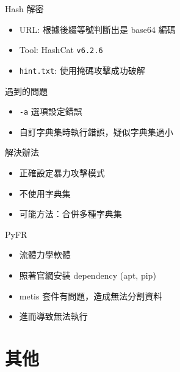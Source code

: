 \documentclass[aspectratio=169]{beamer}
\begin{document}
    \begin{frame}{Hash 解密}
        \begin{itemize}
            \item URL: 根據後綴等號判斷出是 base64 編碼
            \item Tool: HashCat \texttt{v6.2.6}
            \item \texttt{hint.txt}: 使用掩碼攻擊成功破解
        \end{itemize}
        \begin{alertblock}{遇到的問題}
            \begin{itemize}
                \item \texttt{-a} 選項設定錯誤
                \item 自訂字典集時執行錯誤，疑似字典集過小
            \end{itemize}
        \end{alertblock}
        \begin{block}{解決辦法}
            \begin{itemize}
                \item 正確設定暴力攻擊模式
                \item 不使用字典集
                \item 可能方法：合併多種字典集
            \end{itemize}
        \end{block}
    \end{frame}

    \begin{frame}{PyFR}
        \begin{itemize}
            \item 流體力學軟體
            \item 照著官網安裝 dependency (apt, pip)
            \item metis 套件有問題，造成無法分割資料
            \item 進而導致無法執行
        \end{itemize}
    \end{frame}

    \section{其他}
\end{document}
